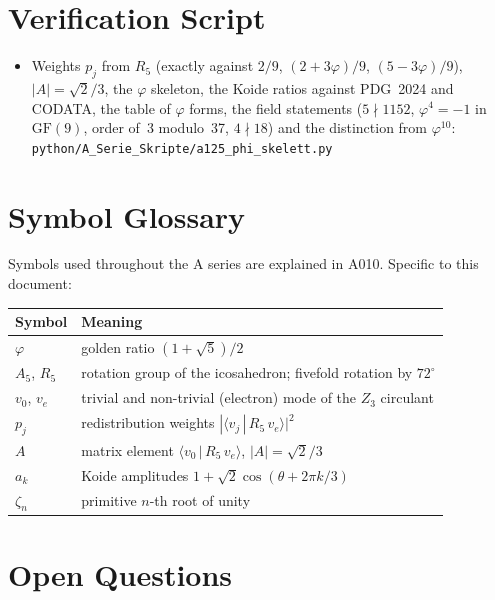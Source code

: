 \section{Verification Script}

\begin{itemize}
  \item Weights $p_j$ from $R_5$ (exactly against $2/9$, $(2+3\varphi)/9$,
    $(5-3\varphi)/9$), $|A|=\sqrt2/3$, the $\varphi$ skeleton, the Koide ratios
    against PDG~2024 and CODATA, the table of $\varphi$ forms, the field
    statements ($5\nmid1152$, $\varphi^4=-1$ in $\mathrm{GF}(9)$, order of~3
    modulo~37, $4\nmid18$) and the distinction from $\varphi^{10}$:
    \texttt{python/A\_Serie\_Skripte/a125\_phi\_skelett.py}
\end{itemize}

\section{Symbol Glossary}

Symbols used throughout the A series are explained in A010. Specific to this
document:

\begin{center}
\renewcommand{\arraystretch}{1.3}
{\small\begin{tabular}{lp{9cm}}
\toprule
Symbol & Meaning \\
\midrule
$\varphi$ & golden ratio $(1+\sqrt5)/2$ \\
$A_5$, $R_5$ & rotation group of the icosahedron; fivefold rotation by $72^\circ$ \\
$v_0$, $v_e$ & trivial and non-trivial (electron) mode of the $Z_3$ circulant \\
$p_j$ & redistribution weights $|\langle v_j\,|\,R_5\,v_e\rangle|^2$ \\
$A$ & matrix element $\langle v_0\,|\,R_5\,v_e\rangle$, $|A|=\sqrt2/3$ \\
$a_k$ & Koide amplitudes $1+\sqrt2\cos(\theta+2\pi k/3)$ \\
$\zeta_n$ & primitive $n$-th root of unity \\
\bottomrule
\end{tabular}}
\renewcommand{\arraystretch}{1.0}
\end{center}

\section{Open Questions}

